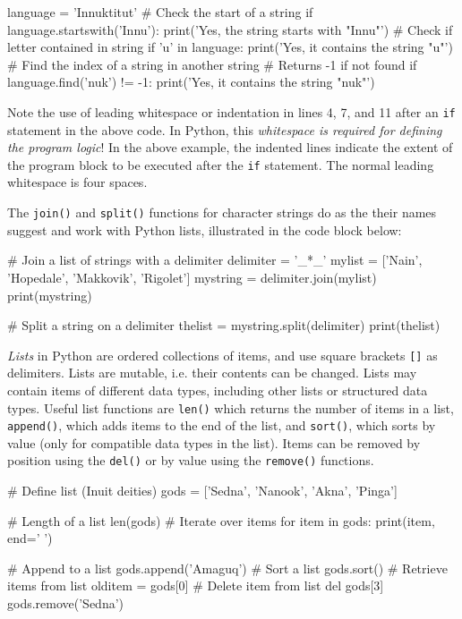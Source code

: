 \begin{pythoncode}
language = 'Innuktitut'
# Check the start of a string
if language.startswith('Innu'):
    print('Yes, the string starts with "Innu"')
# Check if letter contained in string
if 'u' in language:
    print('Yes, it contains the string "u"')
# Find the index of a string in another string
# Returns -1 if not found
if language.find('nuk') != -1:
    print('Yes, it contains the string "nuk"')
\end{pythoncode}

\begin{alertbox}
Note the use of leading whitespace or indentation in lines 4, 7, and 11 after an \texttt{if} statement in the above code. In Python, this \emph{whitespace is required for defining the program logic}! In the above example, the indented lines indicate the extent of the program block to be executed after the \texttt{if} statement. The normal leading whitespace is four spaces. 
\end{alertbox}

The \texttt{join()} and \texttt{split()} functions for character strings do as the their names suggest and work with Python lists, illustrated in the code block below:

\begin{pythoncode}
# Join a list of strings with a delimiter
delimiter = '_*_'
mylist = ['Nain', 'Hopedale', 'Makkovik', 'Rigolet']
mystring = delimiter.join(mylist)
print(mystring)

# Split a string on a delimiter
thelist = mystring.split(delimiter)
print(thelist)
\end{pythoncode}

\emph{Lists} in Python are ordered collections of items, and use square brackets \texttt{[]} as delimiters. Lists are mutable, i.e. their contents can be changed. Lists may contain items of different data types, including other lists or structured data types. Useful list functions are \texttt{len()} which returns the number of items in a list, \texttt{append()}, which adds items to the end of the list, and \texttt{sort()}, which sorts by value (only for compatible data types in the list). Items can be removed by position using the \texttt{del()} or by value using the \texttt{remove()} functions.

\begin{pythoncode}
# Define list (Inuit deities)
gods = ['Sedna', 'Nanook', 'Akna', 'Pinga']

# Length of a list
len(gods)
# Iterate over items
for item in gods:
    print(item, end=' ')

# Append to a list
gods.append('Amaguq')
# Sort a list
gods.sort()
# Retrieve items from list
olditem = gods[0]
# Delete item from list
del gods[3]
gods.remove('Sedna')
\end{pythoncode}

